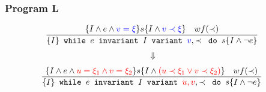 \begin{frame}[containsverbatim]
  \frametitle{Program L}
\begin{align*}
  &\frac{
    \{I \land e \land \textcolor{blue}{v = \xi} \} s \{I \land \textcolor{blue}{v \prec \xi} \} \quad wf(\prec)
  }{
    \{I\} \texttt{ while } e \texttt{ invariant } I
          \texttt{ variant } \textcolor{blue}{v}, \prec \texttt{ do } s \{I \land \neg e\}
  }
\end{align*}
\begin{align*}
  \Downarrow &
\end{align*}
\begin{align*}
  &\frac{
    \{I \land e \land \textcolor{red}{u = \xi_{1} \land v = \xi_{2}} \} s \{I \land \textcolor{red}{(u \prec \xi_{1} \lor v \prec \xi_{2})} \} \quad wf(\prec)
  }{
    \{I\} \texttt{ while } e \texttt{ invariant } I
          \texttt{ variant } \textcolor{red}{u,v} , \prec \texttt{ do } s \{I \land \neg e\}
  }
\end{align*}
\\~\\
\\~\\
\\~\\
\\~\\
\\~\\
\\~\\
\\~\\
\\~\\
\\~\\
\\~\\
\\~\\
\\~\\
\\~\\
\end{frame}

